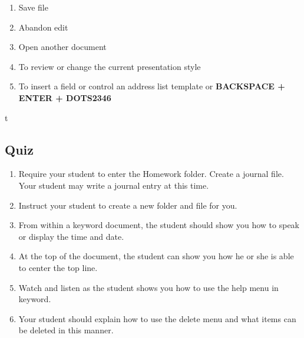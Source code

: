 \documentclass[10pt,letterpaper,twoside]{report}
\begin{document}
{{{\begin{enumerate}
\begin{enumerate}
		\item Save file  
		\item Abandon edit  
		\item Open another document  
		\item To review or change the current presentation style  
		\item To insert a field or control an address list template   or  {\textcolor{accent}{\MakeUppercase{\textbf{backspace + enter + dots2346}}}}
	\end{enumerate}t
\end{enumerate}
\clearpage
\subsection{Quiz}
\begin{enumerate}
	\item Require your student to enter the Homework folder.  Create a journal file.  Your student may write a journal entry at this time.
	\item Instruct your student to create a new folder and file for you.
	\item From within a keyword document, the student should show you how to speak or display the time and date.
	\item At the top of the document, the student can show you how he or she is able to center the top line.
	\item Watch and listen as the student shows you how to use the help menu in keyword.
	\item Your student should explain how to use the delete menu and what items can be deleted in this manner.
\end{enumerate}

\clearpage
}}}
\end{document}
